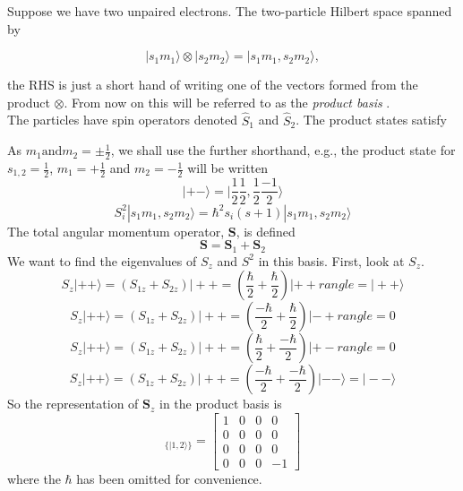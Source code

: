 \documentclass[12pt]{article}
\begin{document}
\noindent Suppose we have two unpaired electrons. The two-particle Hilbert space spanned by

\begin{equation}
|s_{1}m_{1}\rangle \otimes | s_{2}m_{2} \rangle = | s_{1}m_{1}, s_{2}m_{2} \rangle,
\end{equation}

\noindent the RHS is just a short hand of writing one of the vectors formed from the product $\otimes$. From now on this will be referred to as the \emph{product basis} . \\

\noindent The particles have spin operators denoted $\hat{S}_{1}$ and $\hat{S}_{2}$. The product
states satisfy

\noindent As $m_{1}  \text{and} m_{2} = \pm \frac{1}{2} $, we shall use the further shorthand, e.g.,
the product state for $s_{1,2} = \frac{1}{2}$, $m_{1} = +\frac{1}{2}$ and $m_{2} = -\frac{1}{2} $ 
will be written
\begin{equation}
|+-\rangle = | \frac{1}{2}\frac{1}{2},\frac{1}{2}\frac{-1}{2} \rangle
\end{equation}
\begin{equation}
S^{2}_{i}|s_{1}m_{1}, s_{2}m_{2} \rangle = \hbar^{2}s_{i}(s+1)|s_{1}m_{1}, s_{2}m_{2} \rangle
\end{equation}
\noindent The total angular momentum operator, $\mathbf{S}$, is defined 
\begin{equation}
\mathbf{S} = \mathbf{S}_{1}+\mathbf{S}_{2}
\end{equation}
We want to find the eigenvalues of $S_{z}$ and $S^{2}$ in this basis. First, look at
$S_{z}$.
\begin{equation}
S_{z}|++\rangle =
(S_{1z}+S_{2z})|++ = (\frac{\hbar}{2} + \frac{\hbar}{2}) | ++ rangle = |++\rangle
\end{equation}
\begin{equation}
S_{z}|++\rangle =
(S_{1z}+S_{2z})|++ = (\frac{-\hbar}{2} + \frac{\hbar}{2}) | -+ rangle = 0
\end{equation}
\begin{equation}
S_{z}|++\rangle =
(S_{1z}+S_{2z})|++ = (\frac{\hbar}{2} + \frac{-\hbar}{2}) | +- rangle = 0
\end{equation}
\begin{equation}
S_{z}|++\rangle = 
(S_{1z}+S_{2z})|++ = (\frac{-\hbar}{2} + \frac{-\hbar}{2}) | -- \rangle = | -- \rangle
\end{equation}
So the representation of $\mathbf{S}_{z}$ in the product basis is
\begin{equation}
[S_{z}]_{\{|1,2\rangle\}} = 
\begin{bmatrix}
1                  & 0 & 0 & 0 \\
0                  & 0 & 0 & 0 \\
0                  & 0 & 0 & 0 \\
0                  & 0 & 0 & -1 
\end{bmatrix}
\end{equation}
where the $\hbar$ has been omitted for convenience.\\
\end{document}
